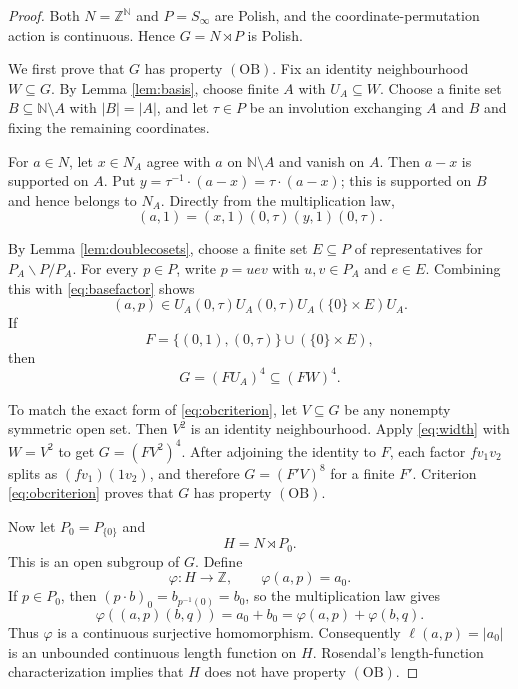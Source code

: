 \documentclass[11pt]{article}
\newcommand{\N}{\mathbb N}
\newcommand{\Z}{\mathbb Z}
\newcommand{\OB}{\mathrm{OB}}
\newcommand{\Sym}{S_\infty}
\begin{document}
\begin{proof}
Both $N=\Z^{\N}$ and $P=\Sym$ are Polish, and the coordinate-permutation
action is continuous.  Hence $G=N\rtimes P$ is Polish.

We first prove that $G$ has property $(\OB)$.  Fix an identity neighbourhood
$W\subseteq G$.  By Lemma \ref{lem:basis}, choose finite $A$ with
$U_A\subseteq W$.  Choose a finite set $B\subseteq\N\setminus A$ with
$|B|=|A|$, and let $\tau\in P$ be an involution exchanging $A$ and $B$ and
fixing the remaining coordinates.

For $a\in N$, let $x\in N_A$ agree with $a$ on $\N\setminus A$ and vanish on
$A$.  Then $a-x$ is supported on $A$.  Put
$y=\tau^{-1}\cdot(a-x)=\tau\cdot(a-x)$; this is supported on $B$ and hence
belongs to $N_A$.  Directly from the multiplication law,
\begin{equation}\label{eq:basefactor}
 (a,1)=(x,1)(0,\tau)(y,1)(0,\tau).
\end{equation}

By Lemma \ref{lem:doublecosets}, choose a finite set $E\subseteq P$ of
representatives for $P_A\backslash P/P_A$.  For every $p\in P$, write
$p=uev$ with $u,v\in P_A$ and $e\in E$.  Combining this with
\eqref{eq:basefactor} shows
\[
 (a,p)\in U_A(0,\tau)U_A(0,\tau)U_A(\{0\}\times E)U_A.
\]
If
\[
 F=\{(0,1),(0,\tau)\}\cup(\{0\}\times E),
\]
then
\begin{equation}\label{eq:width}
 G=(F U_A)^4\subseteq(FW)^4.
\end{equation}

To match the exact form of \eqref{eq:obcriterion}, let $V\subseteq G$ be any
nonempty symmetric open set.  Then $V^2$ is an identity neighbourhood.  Apply
\eqref{eq:width} with $W=V^2$ to get $G=(FV^2)^4$.  After adjoining the
identity to $F$, each factor $f v_1v_2$ splits as
$(f v_1)(1v_2)$, and therefore $G=(F'V)^8$ for a finite $F'$.  Criterion
\eqref{eq:obcriterion} proves that $G$ has property $(\OB)$.

Now let $P_0=P_{\{0\}}$ and
\[
 H=N\rtimes P_0.
\]
This is an open subgroup of $G$.  Define
\[
 \varphi:H\longrightarrow\Z,\qquad \varphi(a,p)=a_0.
\]
If $p\in P_0$, then $(p\cdot b)_0=b_{p^{-1}(0)}=b_0$, so the multiplication
law gives
\[
 \varphi((a,p)(b,q))=a_0+b_0=\varphi(a,p)+\varphi(b,q).
\]
Thus $\varphi$ is a continuous surjective homomorphism.  Consequently
$\ell(a,p)=|a_0|$ is an unbounded continuous length function on $H$.
Rosendal's length-function characterization implies that $H$ does not have
property $(\OB)$.
\end{proof}
\end{document}
